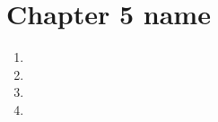 \chapter{Chapter 5 name}
\begin{enumerate}
    \item 
    \item  
    \item 
    \item 
  \end{enumerate}
